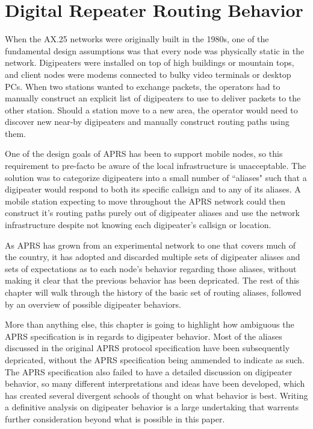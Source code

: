 \chapter{Digital Repeater Routing Behavior}

When the AX.25 networks were originally built in the 1980s,
one of the fundamental design assumptions was that every node was 
physically static in the network.
Digipeaters were installed on top of high buildings or mountain tops, 
and client nodes were modems connected to bulky video terminals or desktop PCs.
When two stations wanted to exchange packets,
the operators had to manually construct an explicit list of digipeaters to use
to deliver packets to the other station.
Should a station move to a new area, 
the operator would need to discover new near-by digipeaters and manually construct
routing paths using them.

One of the design goals of APRS has been to support mobile nodes,
so this requirement to pre-facto be aware of the
local infrastructure is unacceptable.
The solution was to categorize digipeaters into a small number of ``aliases"
such that a digipeater would respond to both its specific callsign
and to any of its aliases.
A mobile station expecting to move throughout the APRS network
could then construct it's routing paths purely out of digipeater aliases
and use the network infrastructure despite not knowing
each digipeater's callsign or location.

As APRS has grown from an experimental network
to one that covers much of the country,
it has adopted and discarded multiple sets of digipeater aliases
and sets of expectations as to each node's behavior regarding those aliases,
without making it clear that the previous behavior has been depricated.
The rest of this chapter will walk through the history
of the basic set of routing aliases,
followed by an overview of possible digipeater behaviors.

More than anything else, this chapter is going to highlight
how ambiguous the APRS specification is in regards to digipeater behavior.
Most of the aliases discussed in the original APRS protocol specification
have been subsequently depricated,
without the APRS specification being ammended to indicate as such.
The APRS specification also failed to have a detailed discussion
on digipeater behavior,
so many different interpretations and ideas have been developed, which has
created several divergent schools of thought on what behavior is best.
Writing a definitive analysis on digipeater behavior is a large undertaking
that warrents further consideration beyond what is possible in this paper.

